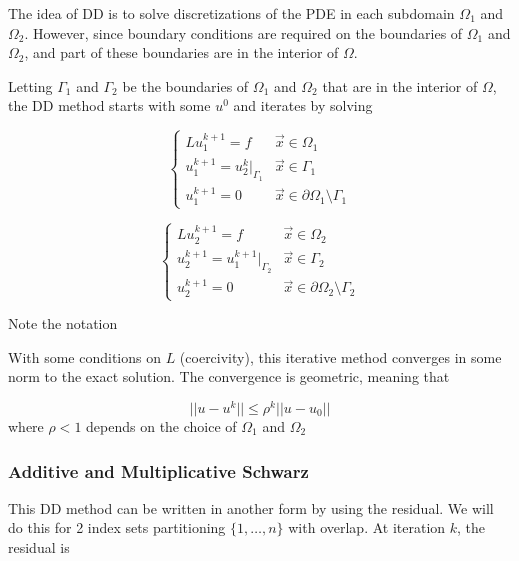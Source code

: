 The idea of DD is to solve discretizations of the PDE in each subdomain $\Omega_1$ and $\Omega_2$. However, since boundary conditions are required on the boundaries of $\Omega_1$ and $\Omega_2$, and part of these boundaries are in the interior of $\Omega$.

\begin{center}
    
\end{center}

Letting $\Gamma_1$ and $\Gamma_2$ be the boundaries of $\Omega_1$ and $\Omega_2$ that are in the interior of $\Omega$, the DD method starts with some $u^0$ and iterates by solving

\begin{equation*}
    \begin{cases}
    Lu_1^{k+1} = f & \vec{x}\in \Omega_1\\
    u_1^{k+1} = u_2^k \bigg\rvert_{\Gamma_1} & \vec{x}\in \Gamma_1 \\
    u_1^{k+1} = 0 & \vec{x} \in \partial \Omega_1 \setminus \Gamma_1
    \end{cases}
\end{equation*}

\begin{equation*}
    \begin{cases}
    Lu_2^{k+1} = f & \vec{x}\in \Omega_2\\
    u_2^{k+1} = u_1^{k+1} \bigg\rvert_{\Gamma_2} & \vec{x}\in \Gamma_2 \\
    u_2^{k+1} = 0 & \vec{x} \in \partial \Omega_2 \setminus \Gamma_2
    \end{cases}
\end{equation*}

Note the notation

\begin{center}
    
\end{center}

With some conditions on $L$ (coercivity), this iterative method converges in some norm to the exact solution. The convergence is geometric, meaning that

\begin{equation*}
    || u-u^k|| \leq \rho^k || u-u_0||
\end{equation*}
where $\rho<1$ depends on the choice of $\Omega_1$ and $\Omega_2$


\subsubsection{Additive and Multiplicative Schwarz}
This DD method can be written in another form by using the residual. We will do this for 2 index sets partitioning $\{ 1, \ldots, n \}$ with overlap. At iteration $k$, the residual is

